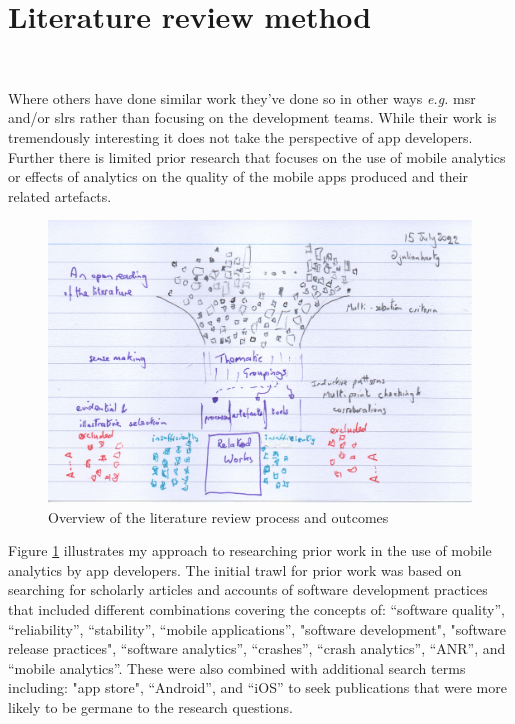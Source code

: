 \section{Literature review method}~\label{rw-tactics-and-topics-for-this-chapter}

Where others have done similar work they've done so in other ways \emph{e.g.} \Gls{msr} and/or \Glspl{slr} rather than focusing on the development teams. While their work is tremendously interesting it does not take the perspective of app developers. Further there is limited prior research that focuses on the use of mobile analytics or effects of analytics on the quality of the mobile apps produced and their related artefacts. 


\begin{figure}
    \centering
    \includegraphics[width=\textwidth]{images/rough-sketches/literature-review-overview.jpeg}
    \caption{Overview of the literature review process and outcomes}
    \label{fig:literature-review-overview}
\end{figure}

Figure \ref{fig:literature-review-overview} illustrates my approach to researching prior work in the use of mobile analytics by app developers. 
%
The initial trawl for prior work was based on searching for scholarly articles and accounts of software development practices that included different combinations covering the concepts of: ``software quality'', ``reliability'', ``stability'', ``mobile applications'', "software development", "software release practices", ``software analytics'', ``crashes'', ``crash analytics'', ``ANR'', and ``mobile analytics''. These were also combined with additional search terms including: "app store", ``Android'', and ``iOS'' to seek publications that were more likely to be germane to the research questions.  

